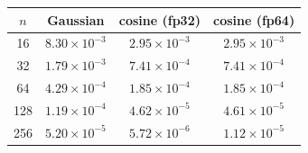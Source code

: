 \begin{tabular}{@{}cccc@{}}
\toprule
$n$ & Gaussian & cosine (fp32) & cosine (fp64) \\
\midrule
16 & $8.30 \times 10^{-3}$ & $2.95 \times 10^{-3}$ & $2.95 \times 10^{-3}$ \\
32 & $1.79 \times 10^{-3}$ & $7.41 \times 10^{-4}$ & $7.41 \times 10^{-4}$ \\
64 & $4.29 \times 10^{-4}$ & $1.85 \times 10^{-4}$ & $1.85 \times 10^{-4}$ \\
128 & $1.19 \times 10^{-4}$ & $4.62 \times 10^{-5}$ & $4.61 \times 10^{-5}$ \\
256 & $5.20 \times 10^{-5}$ & $5.72 \times 10^{-6}$ & $1.12 \times 10^{-5}$ \\
\bottomrule
\end{tabular}
